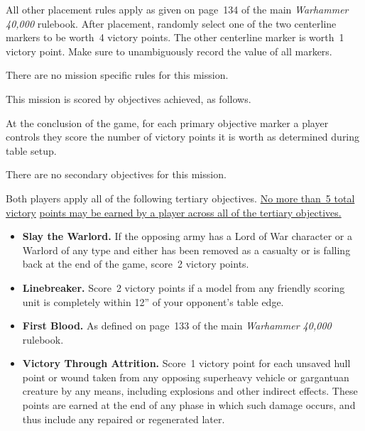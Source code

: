 All other placement rules apply as given on page~134 of the main
\emph{Warhammer 40,000} rulebook.  After placement, randomly select
one of the two centerline markers to be worth~4 victory points.  The
other centerline marker is worth~1 victory point.  Make sure to
unambiguously record the value of all markers.



There are no mission specific rules for this mission.



This mission is scored by objectives achieved, as follows.

 At the conclusion of the game,
for each primary objective marker a player controls they score the
number of victory points it is worth as determined during table setup.


There are no secondary objectives for this mission.

  Both players apply all of
the following tertiary objectives.  \underline{No more than~5 total
  victory} \underline{points may be earned by a player across all of
  the tertiary objectives.}

\begin{itemize}
\item \textbf{Slay the Warlord.}  If the opposing army has a Lord of
  War character or a Warlord of any type and either has been removed
  as a casualty or is falling back at the end of the game, score~2
  victory points.

\item \textbf{Linebreaker.}  Score~2 victory points if a model from
  any friendly scoring unit is completely within 12'' of your
  opponent's table edge.

\item \textbf{First Blood.}  As defined on page~133 of the main
  \emph{Warhammer 40,000} rulebook.

\item \textbf{Victory Through Attrition.}  Score~1 victory point for
  each unsaved hull point or wound taken from any opposing superheavy
  vehicle or gargantuan creature by any means, including explosions
  and other indirect effects.  These points are earned at the end of
  any phase in which such damage occurs, and thus include any repaired
  or regenerated later.
\end{itemize}


